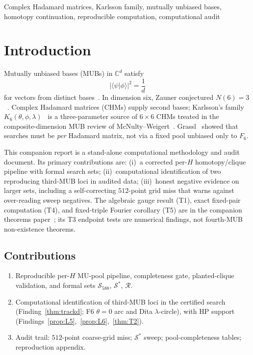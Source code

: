 \documentclass[onecolumn]{IEEEtran}
\begin{document}
\begin{IEEEkeywords}
Complex Hadamard matrices, Karlsson family, mutually unbiased bases, homotopy continuation, reproducible computation, computational audit
\end{IEEEkeywords}

\section{Introduction}
\label{sec:intro}

Mutually unbiased bases (MUBs) in $\mathbb{C}^d$ satisfy
\begin{equation}
    \label{eq:mu}
    \bigl|\langle\psi|\phi\rangle\bigr|^2 = \frac{1}{d}
\end{equation}
for vectors from distinct bases~\cite{BengtssonMUH2007, Brierley2009}.
In dimension six, Zauner conjectured $N(6)=3$~\cite{Zauner1999, Scott2010}.
Complex Hadamard matrices (CHMs) supply second bases; Karlsson's family $K_6(\theta,\phi,\lambda)$~\cite{Karlsson2011} is a three-parameter source of $6\times6$ CHMs treated in the composite-dimension MUB review of McNulty--Weigert~\cite{McNulty2026}.
Grassl~\cite{Grassl2004} showed that searches must be \emph{per} Hadamard matrix, not via a fixed pool unbiased only to $F_6$.

This companion report is a stand-alone computational methodology and audit document.
Its primary contributions are: (i)~a corrected per-$H$ homotopy/clique pipeline with formal search sets; (ii)~computational identification of two reproducing third-MUB loci in audited data; (iii)~honest negative evidence on larger sets, including a self-correcting $512$-point grid miss that warns against over-reading sweep negatives.
The algebraic gauge result (T1), exact fixed-pair computation (T4), and fixed-triple Fourier corollary (T5) are in the companion theorems paper~\cite{JaupiTheorems2026}; its T3 endpoint tests are numerical findings, not fourth-MUB non-existence theorems.

\subsection{Contributions}
\begin{enumerate}
    \item[\textbf{M1}] Reproducible per-$H$ MU-pool pipeline, completeness gate, planted-clique validation, and formal sets $\mathcal{S}_{588}$, $\mathcal{S}^*$, $\mathcal{R}$.
    \item[\textbf{M2}] Computational identification of third-MUB loci in the certified search (Finding~\ref{thm:trackd}; F6 $\theta{=}0$ arc and Dita $\lambda$-circle), with HP support (Findings~\ref{prop:L5},~\ref{prop:L6},~\ref{thm:T2}).
    \item[\textbf{M3}] Audit trail: $512$-point coarse-grid miss; $\mathcal{S}^*$ sweep; pool-completeness tables; reproduction appendix.
\end{enumerate}
\end{document}
